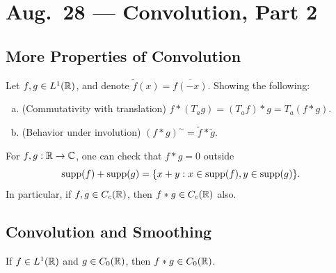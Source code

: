 \chapter{Aug.~28 --- Convolution, Part 2}

\section{More Properties of Convolution}

\begin{exercise}
  Let $f, g \in L^1(\mathbb{R})$, and denote
  $\widetilde{f}(x) = \overline{f(-x)}$.
  Showing the following:
  \begin{enumerate}[(a)]
    \item (Commutativity with translation)
      $f * (T_a g) = (T_a f) * g = T_a (f * g)$.
    \item (Behavior under involution)
      $(f * g)^\sim = \widetilde{f} * \widetilde{g}$.
  \end{enumerate}
\end{exercise}

\begin{remark}
  For $f, g : \mathbb{R} \to \mathbb{C}$, one can check that
  $f * g = 0$ outside
  \[
    \operatorname{supp}(f) + \operatorname{supp}(g)
    = \{x + y : x \in \operatorname{supp}(f), y \in \operatorname{supp}(g)\}.
  \]
  In particular, if $f, g \in C_c(\mathbb{R})$, then
  $f * g \in C_c(\mathbb{R})$ also.
\end{remark}

\section{Convolution and Smoothing}

\begin{theorem}\label{thm:conv-decay-at-infty}
  If $f \in L^1(\mathbb{R})$ and $g \in C_0(\mathbb{R})$, then
  $f * g \in C_0(\mathbb{R})$.
\end{theorem}


